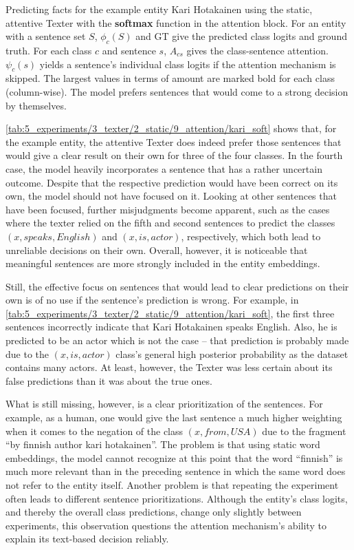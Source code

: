 \begin{table}[t]
    \makebox[\textwidth][c]{
        
    }
    \caption{Predicting facts for the example entity Kari Hotakainen using the static, attentive Texter with the \textbf{softmax} function in the attention block. For an entity with a sentence set $S$, $\phi_c(S)$ and GT give the predicted class logits and ground truth. For each class $c$ and sentence $s$, $A_{cs}$ gives the class-sentence attention. $\psi_c(s)$ yields a sentence's individual class logits if the attention mechanism is skipped. The largest values in terms of amount are marked bold for each class (column-wise). The model prefers sentences that would come to a strong decision by themselves.}
    \label{tab:5_experiments/3_texter/2_static/9_attention/kari_soft}
\end{table}

\autoref{tab:5_experiments/3_texter/2_static/9_attention/kari_soft} shows that, for the example entity, the attentive Texter does indeed prefer those sentences that would give a clear result on their own for three of the four classes. In the fourth case, the model heavily incorporates a sentence that has a rather uncertain outcome. Despite that the respective prediction would have been correct on its own, the model should not have focused on it. Looking at other sentences that have been focused, further misjudgments become apparent, such as the cases where the texter relied on the fifth and second sentences to predict the classes $(x, speaks, English)$ and $(x, is, actor)$, respectively, which both lead to unreliable decisions on their own. Overall, however, it is noticeable that meaningful sentences are more strongly included in the entity embeddings.

Still, the effective focus on sentences that would lead to clear predictions on their own is of no use if the sentence's prediction is wrong. For example, in \autoref{tab:5_experiments/3_texter/2_static/9_attention/kari_soft}, the first three sentences incorrectly indicate that Kari Hotakainen speaks English. Also, he is predicted to be an actor which is not the case -- that prediction is probably made due to the $(x, is, actor)$ class's general high posterior probability as the dataset contains many actors. At least, however, the Texter was less certain about its false predictions than it was about the true ones.

What is still missing, however, is a clear prioritization of the sentences. For example, as a human, one would give the last sentence a much higher weighting when it comes to the negation of the class $(x, from, USA)$ due to the fragment ``by finnish author kari hotakainen''. The problem is that using static word embeddings, the model cannot recognize at this point that the word ``finnish'' is much more relevant than in the preceding sentence in which the same word does not refer to the entity itself. Another problem is that repeating the experiment often leads to different sentence prioritizations. Although the entity's class logits, and thereby the overall class predictions, change only slightly between experiments, this observation questions the attention mechanism's ability to explain its text-based decision reliably.

